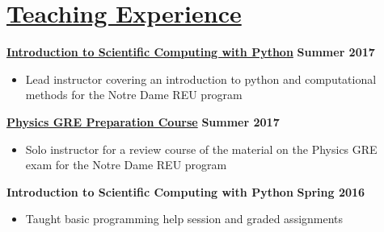 \documentclass[margin]{res}
\begin{document}
\begin{resume}
\begin{tabular}{l p{4.9in}}
\end{tabular}





\section{\href{https://www3.nd.edu/~brose3/\#classes}{Teaching Experience}}\label{teaching}
\textbf{\href{https://www3.nd.edu/~brose3/2017reu-cmp}{Introduction to Scientific Computing with Python}} \hfill{} \textbf{Summer 2017}
\begin{itemize}\itemsep -2pt
    \item[] Lead instructor covering an introduction to python and computational \\methods for the Notre Dame REU program
    \end{itemize} \vspace{-12pt}
\textbf{\href{https://www3.nd.edu/~brose3/2017reu-gre}{Physics GRE Preparation Course}} \hfill{} \textbf{Summer 2017}
\begin{itemize}\itemsep -2pt
    \item[] Solo instructor for a review course of the material on the Physics GRE \\exam for the Notre Dame REU program
    \end{itemize} \vspace{-12pt}
\textbf{Introduction to Scientific Computing with Python} \hfill{} \textbf{Spring 2016}
    \begin{itemize}\itemsep -2pt
    \item[] Taught basic programming help session and graded assignments

\end{itemize}
\end{resume}
\end{document}
